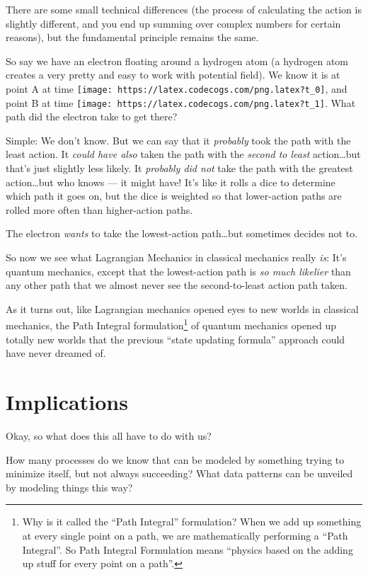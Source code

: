 \documentclass[]{article}
\begin{document}
There are some small technical differences (the process of calculating the
action is slightly different, and you end up summing over complex numbers for
certain reasons), but the fundamental principle remains the same.

So say we have an electron floating around a hydrogen atom (a hydrogen atom
creates a very pretty and easy to work with potential field). We know it is at
point A at time \texttt{[image: https://latex.codecogs.com/png.latex?t\_0]}, and
point B at time \texttt{[image: https://latex.codecogs.com/png.latex?t\_1]}. What
path did the electron take to get there?

Simple: We don't know. But we can say that it \emph{probably} took the path with
the least action. It \emph{could have also} taken the path with the \emph{second
to least} action\ldots but that's just slightly less likely. It \emph{probably
did not} take the path with the greatest action\ldots but who knows --- it might
have! It's like it rolls a dice to determine which path it goes on, but the dice
is weighted so that lower-action paths are rolled more often than higher-action
paths.

The electron \emph{wants} to take the lowest-action path\ldots but sometimes
decides not to.

So now we see what Lagrangian Mechanics in classical mechanics really \emph{is}:
It's quantum mechanics, except that the lowest-action path is \emph{so much
likelier} than any other path that we almost never see the second-to-least
action path taken.

As it turns out, like Lagrangian mechanics opened eyes to new worlds in
classical mechanics, the Path Integral formulation\footnote{Why is it called the
  ``Path Integral'' formulation? When we add up something at every single point
  on a path, we are mathematically performing a ``Path Integral''. So Path
  Integral Formulation means ``physics based on the adding up stuff for every
  point on a path''.} of quantum mechanics opened up totally new worlds that the
previous ``state updating formula'' approach could have never dreamed of.

\hypertarget{implications}{%
\section{Implications}\label{implications}}

Okay, so what does this all have to do with us?

How many processes do we know that can be modeled by something trying to
minimize itself, but not always succeeding? What data patterns can be unveiled
by modeling things this way?
\end{document}
